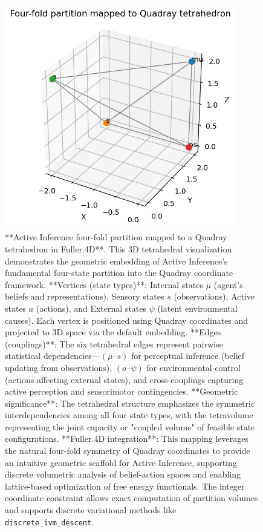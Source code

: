 \documentclass[
  10pt,
]{article}
\begin{document}
\begin{figure}[htbp]
\centering
\includegraphics[width=0.9\textwidth]{figures/partition_tetrahedron.png}
\caption{**Active Inference four-fold partition mapped to a Quadray tetrahedron in Fuller.4D**. This 3D tetrahedral visualization demonstrates the geometric embedding of Active Inference's fundamental four-state partition into the Quadray coordinate framework. **Vertices (state types)**: Internal states $\mu$ (agent's beliefs and representations), Sensory states $s$ (observations), Active states $a$ (actions), and External states $\psi$ (latent environmental causes). Each vertex is positioned using Quadray coordinates and projected to 3D space via the default embedding. **Edges (couplings)**: The six tetrahedral edges represent pairwise statistical dependencies—$(\mu\text{--}s)$ for perceptual inference (belief updating from observations), $(a\text{--}\psi)$ for environmental control (actions affecting external states), and cross-couplings capturing active perception and sensorimotor contingencies. **Geometric significance**: The tetrahedral structure emphasizes the symmetric interdependencies among all four state types, with the tetravolume representing the joint capacity or "coupled volume" of feasible state configurations. **Fuller.4D integration**: This mapping leverages the natural four-fold symmetry of Quadray coordinates to provide an intuitive geometric scaffold for Active Inference, supporting discrete volumetric analysis of belief-action spaces and enabling lattice-based optimization of free energy functionals. The integer coordinate constraint allows exact computation of partition volumes and supports discrete variational methods like \texttt{discrete\_ivm\_descent}.}
\label{fig:partition_tetrahedron}
\end{figure}
\end{document}
